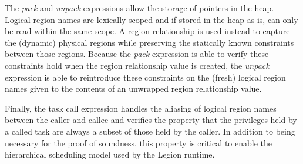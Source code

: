 The {\em pack} and {\em unpack} expressions allow the storage of pointers in the heap.  Logical region names
are lexically scoped and if stored in the heap as-is, can only be read within the same scope.  A region relationship
is used instead to capture the (dynamic) physical regions while preserving the statically known constraints
between those regions.  Because the {\em pack} expression is able to verify these constraints hold when the 
region relationship value is created, the {\em unpack} expression is able to reintroduce these constraints on
the (fresh) logical region names given to the contents of an unwrapped region relationship value.

Finally, the task call expression handles the aliasing of logical region names between the caller and callee and
verifies the property that the privileges held by a called task are always a subset of those held
by the caller.  In addition to being necessary for the proof of soundness, this property is critical to
enable the hierarchical scheduling model used by the Legion runtime.

